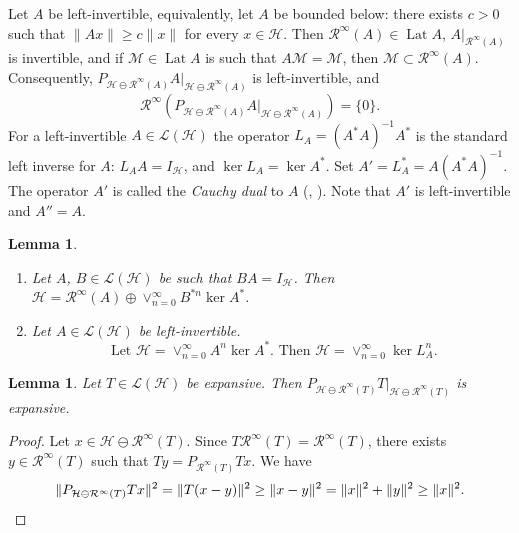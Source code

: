 \documentclass[a4paper,oneside,11pt]{amsart}
\numberwithin{equation}{section}
\theoremstyle{plain}
\newtheorem{lemma}[theorem]{Lemma}
\theoremstyle{definition}
\begin{document}
Let $A$ be left-invertible, equivalently, let $A$ be bounded below:
 there exists $c>0$ such that $\|Ax\|\geq c\|x\|$ for every $x\in \mathcal H$. 
Then $\mathcal R^\infty(A)\in\operatorname{Lat}A$, $A|_{\mathcal R^\infty(A)}$ is invertible,  and if 
 $\mathcal M\in\operatorname{Lat}A$ is such that $A\mathcal M=\mathcal M$, then $\mathcal M\subset\mathcal R^\infty(A)$. 
Consequently, 
$P_{\mathcal H\ominus\mathcal R^\infty(A)}A|_{\mathcal H\ominus\mathcal R^\infty(A)}$ is left-invertible, and 
\begin{equation} \label{pure} 
\mathcal R^\infty(P_{\mathcal H\ominus\mathcal R^\infty(A)}A|_{\mathcal H\ominus\mathcal R^\infty(A)})=\{0\}.
\end{equation}  
For a left-invertible $A\in\mathcal L(\mathcal H)$ the operator $L_A=(A^*A)^{-1}A^*$ is the standard  left inverse for $A$: 
 $L_AA=I_{\mathcal H}$,  and $\ker L_A=\ker A^*$. Set $A'=L_A^*=A(A^*A)^{-1}$. The operator $A'$ is called the \emph{Cauchy dual} to $A$ (\cite{shimorin},  \cite{olofsson}).   Note that $A'$ is left-invertible and $A''=A$.


\begin{lemma} \label{lemshimorin} \begin{enumerate}[\upshape (i)]

\item {\cite[Prop. 2.7]{shimorin}}
 Let $A$, $B\in\mathcal L(\mathcal H)$ be such that $BA=I_{\mathcal H}$. Then 
$ \mathcal H=\mathcal R^\infty(A)\oplus\vee_{n=0}^\infty B^{*n}\ker A^*$.

\item {\cite[Lemma 2.1]{shimorin}}
 Let $A\in\mathcal L(\mathcal H)$ be left-invertible.
 \begin{equation*} \text { Let }\mathcal H=\vee_{n=0}^\infty A^n\ker A^*. \text{ Then  }
\mathcal H=\vee_{n=0}^\infty \ker L_A^n.\end{equation*}
\end{enumerate}
\end{lemma}



\begin{lemma}\label{lemexp} Let $T\in\mathcal L(\mathcal H)$ be expansive. 
Then $P_{\mathcal H\ominus\mathcal R^\infty(T)}T|_{\mathcal H\ominus\mathcal R^\infty(T)}$ is expansive.
\end{lemma}
\begin{proof} Let $x\in \mathcal H\ominus\mathcal R^\infty(T)$. Since $T\mathcal R^\infty(T)=\mathcal R^\infty(T)$, 
there exists $y\in\mathcal R^\infty(T)$ such that $Ty=P_{\mathcal R^\infty(T)}Tx$. We have
\begin{equation*} \|P_{\mathcal H\ominus\mathcal R^\infty(T)}Tx\|^2=\|T(x-y)\|^2\geq \|x-y\|^2=
\|x\|^2+\|y\|^2\geq \|x\|^2.\qedhere\end{equation*} 
\end{proof} 
\end{document}
